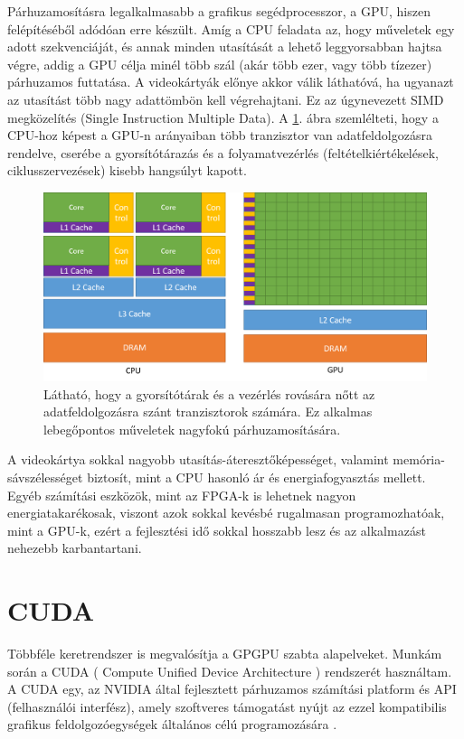 Párhuzamosításra legalkalmasabb a grafikus segédprocesszor, a GPU, hiszen felépítéséből adódóan erre készült. Amíg a CPU feladata az, hogy műveletek egy adott szekvenciáját, és annak minden utasítását a lehető leggyorsabban hajtsa végre, addig a GPU célja minél több szál (akár több ezer, vagy több tízezer) párhuzamos futtatása. A videokártyák előnye akkor válik láthatóvá, ha ugyanazt az utasítást több nagy adattömbön kell végrehajtani. Ez az úgynevezett SIMD megközelítés (Single Instruction Multiple Data). \cite{kvantum_optim}
A \ref{TransistorsInGpu}. ábra szemlélteti, hogy a CPU-hoz képest a GPU-n arányaiban több tranzisztor van adatfeldolgozásra rendelve, cserébe a gyorsítótárazás és a folyamatvezérlés (feltételkiértékelések, ciklusszervezések) kisebb hangsúlyt kapott.

\begin{figure}[ht!]
	\centering
	\includegraphics[width=150mm, keepaspectratio] {figures/gpu-devotes-more-transistors-to-data-processing.png}
	\caption{Látható, hogy a gyorsítótárak és a vezérlés rovására nőtt az adatfeldolgozásra szánt tranzisztorok számára. Ez alkalmas lebegőpontos műveletek nagyfokú párhuzamosítására. \cite{CUDAdoc} \label{TransistorsInGpu} }
\end{figure}


A videokártya sokkal nagyobb utasítás-áteresztőképességet, valamint memória-sávszélességet biztosít, mint a CPU hasonló ár és energiafogyasztás mellett. Egyéb számítási eszközök, mint az FPGA-k is lehetnek nagyon energiatakarékosak, viszont azok sokkal kevésbé rugalmasan programozhatóak, mint a GPU-k, ezért a fejlesztési idő sokkal hosszabb lesz és az alkalmazást nehezebb karbantartani. \cite{CUDAdoc}

\section{CUDA}
Többféle keretrendszer is megvalósítja a GPGPU szabta alapelveket. Munkám során a CUDA ( Compute Unified Device Architecture ) rendszerét használtam. A CUDA egy, az NVIDIA által fejlesztett párhuzamos számítási platform és API (felhasználói interfész), amely szoftveres támogatást nyújt az ezzel kompatibilis grafikus feldolgozóegységek általános célú programozására \cite{kvantum_optim}. 

